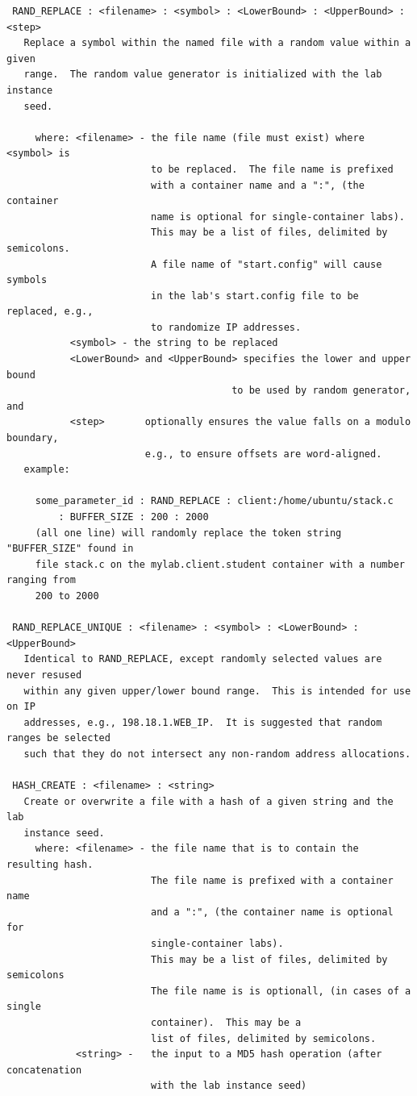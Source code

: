 \documentclass[12pt]{article}
\begin{document}
\begin{verbatim}
 RAND_REPLACE : <filename> : <symbol> : <LowerBound> : <UpperBound> : <step>
   Replace a symbol within the named file with a random value within a given
   range.  The random value generator is initialized with the lab instance
   seed.

     where: <filename> - the file name (file must exist) where <symbol> is 
                         to be replaced.  The file name is prefixed 
                         with a container name and a ":", (the container 
                         name is optional for single-container labs).  
                         This may be a list of files, delimited by semicolons. 
                         A file name of "start.config" will cause symbols
                         in the lab's start.config file to be replaced, e.g.,
                         to randomize IP addresses.
           <symbol> - the string to be replaced
           <LowerBound> and <UpperBound> specifies the lower and upper bound
                                       to be used by random generator, and
           <step>       optionally ensures the value falls on a modulo boundary,
                        e.g., to ensure offsets are word-aligned.
   example:

     some_parameter_id : RAND_REPLACE : client:/home/ubuntu/stack.c 
         : BUFFER_SIZE : 200 : 2000
     (all one line) will randomly replace the token string "BUFFER_SIZE" found in
     file stack.c on the mylab.client.student container with a number ranging from 
     200 to 2000

 RAND_REPLACE_UNIQUE : <filename> : <symbol> : <LowerBound> : <UpperBound>
   Identical to RAND_REPLACE, except randomly selected values are never resused
   within any given upper/lower bound range.  This is intended for use on IP
   addresses, e.g., 198.18.1.WEB_IP.  It is suggested that random ranges be selected
   such that they do not intersect any non-random address allocations.
 
 HASH_CREATE : <filename> : <string>
   Create or overwrite a file with a hash of a given string and the lab 
   instance seed.
     where: <filename> - the file name that is to contain the resulting hash.
                         The file name is prefixed with a container name 
                         and a ":", (the container name is optional for 
                         single-container labs).  
                         This may be a list of files, delimited by semicolons 
                         The file name is is optionall, (in cases of a single
                         container).  This may be a 
                         list of files, delimited by semicolons.
            <string> -   the input to a MD5 hash operation (after concatenation 
                         with the lab instance seed)
                       

\end{verbatim}
\end{document}
